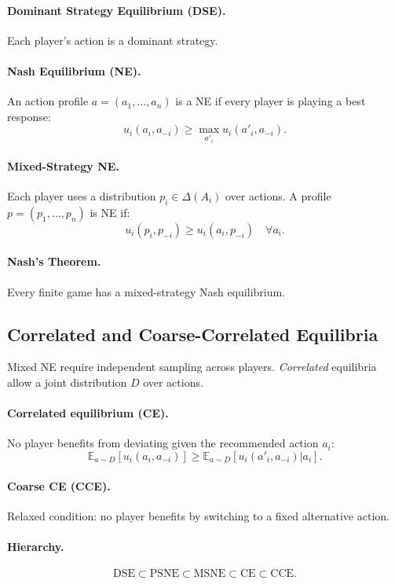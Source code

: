 \documentclass[12pt]{article}
\begin{document}
\paragraph{Dominant Strategy Equilibrium (DSE).}
Each player's action is a dominant strategy.

\paragraph{Nash Equilibrium (NE).}
An action profile $a=(a_1,\dots,a_n)$ is a NE if every player is playing a best
response:
\[
		u_i(a_i,a_{-i}) \ge \max_{a'_i} u_i(a'_i,a_{-i}).
\]

\paragraph{Mixed-Strategy NE.}
Each player uses a distribution $p_i \in \Delta(A_i)$ over actions.
A profile $p=(p_1,\dots,p_n)$ is NE if:
\[
		u_i(p_i,p_{-i}) \ge u_i(a_i,p_{-i}) \quad \forall a_i.
\]

\paragraph{Nash’s Theorem.}
Every finite game has a mixed-strategy Nash equilibrium.

\subsection*{Correlated and Coarse-Correlated Equilibria}
Mixed NE require independent sampling across players.
\emph{Correlated} equilibria allow a joint distribution $D$ over actions.

\paragraph{Correlated equilibrium (CE).}
No player benefits from deviating given the recommended action $a_i$:
\[
		\mathbb{E}_{a\sim D}[u_i(a_i,a_{-i})]
		\ge
		\mathbb{E}_{a\sim D}[u_i(a'_i,a_{-i}) | a_i].
\]

\paragraph{Coarse CE (CCE).}
Relaxed condition: no player benefits by switching to a fixed alternative action.

\paragraph{Hierarchy.}
\[
		\text{DSE} \subset \text{PSNE} \subset \text{MSNE} \subset \text{CE} \subset \text{CCE}.
\]
\end{document}
